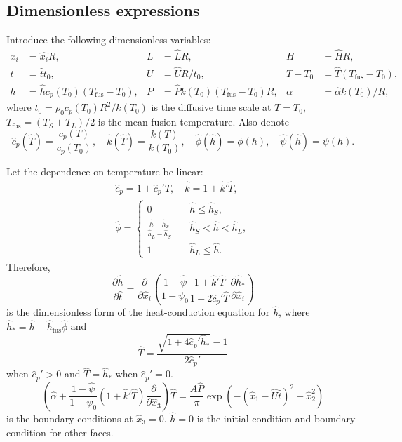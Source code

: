 \documentclass{article}
\newcommand{\pder}[2][]{\frac{\partial#1}{\partial#2}}
\newcommand{\fusion}[1]{{#1}_\mathrm{fus}}
\begin{document}
\subsection{Dimensionless expressions}

Introduce the following dimensionless variables:
\begin{equation}\label{eq:dimensionless}
    \begin{aligned}
        x_i &= \hat{x_i}R, & L &= \hat{L}R, & H &= \hat{H}R, \\
        t &= \hat{t}t_0, & U &= \hat{U}R/t_0, & T - T_0 &= \hat{T}(\fusion{T}-T_0), \\
        h &= \hat{h}c_p(T_0)(\fusion{T}-T_0), & P &= \hat{P} k(T_0)(\fusion{T}-T_0)R, & \alpha &= \hat{\alpha}k(T_0)/R,
    \end{aligned}
\end{equation}
where \(t_0=\rho_0 c_p(T_0) R^2/k(T_0)\) is the diffusive time scale at \(T=T_0\),
\(\fusion{T}=(T_S+T_L)/2\) is the mean fusion temperature.
Also denote
\begin{equation}
    \hat{c}_p(\hat{T}) = \frac{c_p(T)}{c_p(T_0)}, \quad
    \hat{k}(\hat{T}) = \frac{k(T)}{k(T_0)}, \quad
    \hat{\phi}(\hat{h}) = \phi(h), \quad
    \hat{\psi}(\hat{h}) = \psi(h).
\end{equation}

Let the dependence on temperature be linear:
\begin{gather}
	\hat{c}_p = 1 + \hat{c}_p'\hat{T}, \quad
	\hat{k} = 1 + \hat{k}'\hat{T}, \\
	\hat{\phi} = \begin{cases}
        0 & \quad \hat{h} \leq \hat{h}_S, \\
        \frac{\hat{h}-\hat{h}_S}{\hat{h}_L-\hat{h}_S} & \quad \hat{h}_S < \hat{h} < \hat{h}_L, \\
        1 & \quad \hat{h}_L \leq \hat{h}.
    \end{cases}
\end{gather}
Therefore,
\begin{equation}\label{eq:heat_conduction_hats}
	\pder[\hat{h}]{\hat{t}} = \pder{\hat{x}_i}\left(
	    \frac{1 - \hat{\psi}}{1 - \psi_0}
	    \frac{1 + \hat{k}'\hat{T}}{1 + 2\hat{c}_p'\hat{T}}
	    \pder[\hat{h}_*]{\hat{x}_i}
	\right)
\end{equation}
is the dimensionless form of the heat-conduction equation for \(\hat{h}\),
where \(\hat{h}_* = \hat{h} - \fusion{\hat{h}}\hat{\phi}\) and
\begin{equation}\label{eq:temperature}
	\hat{T} = \frac{\sqrt{1+4\hat{c}_p'\hat{h}_*}-1}{2\hat{c}_p'}
\end{equation}
when \(\hat{c}_p'>0\) and \(\hat{T} = \hat{h}_*\) when \(\hat{c}_p'=0\).
\begin{equation}\label{eq:bc_hats}
	\left( \hat{\alpha} + \frac{1 - \hat{\psi}}{1 - \psi_0}\left(1 + \hat{k}'\hat{T}\right)\pder{\hat{x}_3}\right)\hat{T}
	    = \frac{A\hat{P}}{\pi}\exp\left(-(\hat{x}_1-\hat{U}\hat{t})^2 - \hat{x}_2^2\right)
\end{equation}
is the boundary conditions at \(\hat{x}_3=0\).
\(\hat{h} = 0\) is the initial condition and boundary condition for other faces.
\end{document}
